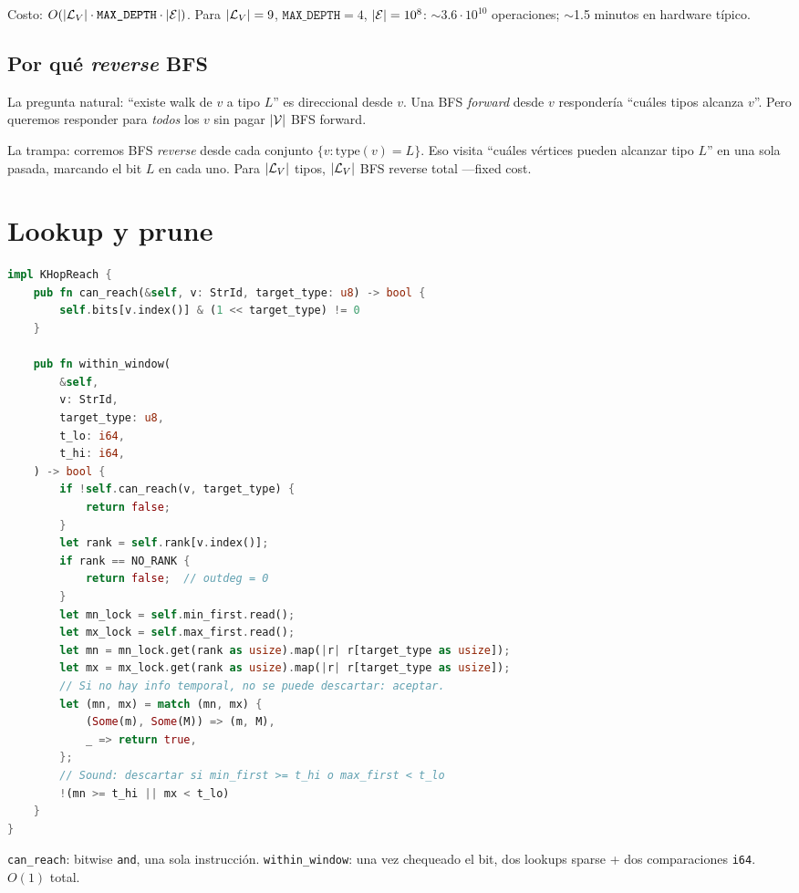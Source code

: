 \noindent
Costo: \(O(|\mathcal{L}_V| \cdot \texttt{MAX\_DEPTH} \cdot |\mathcal{E}|)\). Para
\(|\mathcal{L}_V| = 9\), \(\texttt{MAX\_DEPTH} = 4\), \(|\mathcal{E}| = 10^8\):
\(\sim 3.6 \cdot 10^{10}\) operaciones; $\sim$1.5 minutos en
hardware típico.

\subsection{Por qué \emph{reverse} BFS}

La pregunta natural: ``existe walk de \(v\) a tipo \(L\)'' es
direccional desde \(v\). Una BFS \emph{forward} desde \(v\)
respondería ``cuáles tipos alcanza \(v\)''. Pero queremos
responder para \emph{todos} los \(v\) sin pagar \(|\mathcal{V}|\) BFS
forward.

La trampa: corremos BFS \emph{reverse} desde cada conjunto
\(\{v : \mathrm{type}(v) = L\}\). Eso visita ``cuáles vértices
pueden alcanzar tipo \(L\)'' en una sola pasada, marcando el bit
\(L\) en cada uno. Para \(|\mathcal{L}_V|\) tipos, \(|\mathcal{L}_V|\) BFS
reverse total ---fixed cost.

\section{Lookup y prune}

\begin{lstlisting}[language=Rust]
impl KHopReach {
    pub fn can_reach(&self, v: StrId, target_type: u8) -> bool {
        self.bits[v.index()] & (1 << target_type) != 0
    }

    pub fn within_window(
        &self,
        v: StrId,
        target_type: u8,
        t_lo: i64,
        t_hi: i64,
    ) -> bool {
        if !self.can_reach(v, target_type) {
            return false;
        }
        let rank = self.rank[v.index()];
        if rank == NO_RANK {
            return false;  // outdeg = 0
        }
        let mn_lock = self.min_first.read();
        let mx_lock = self.max_first.read();
        let mn = mn_lock.get(rank as usize).map(|r| r[target_type as usize]);
        let mx = mx_lock.get(rank as usize).map(|r| r[target_type as usize]);
        // Si no hay info temporal, no se puede descartar: aceptar.
        let (mn, mx) = match (mn, mx) {
            (Some(m), Some(M)) => (m, M),
            _ => return true,
        };
        // Sound: descartar si min_first >= t_hi o max_first < t_lo
        !(mn >= t_hi || mx < t_lo)
    }
}
\end{lstlisting}

\noindent
\texttt{can\_reach}: bitwise \texttt{and}, una sola instrucción.
\texttt{within\_window}: una vez chequeado el bit, dos lookups
sparse + dos comparaciones \texttt{i64}. \(O(1)\) total.

